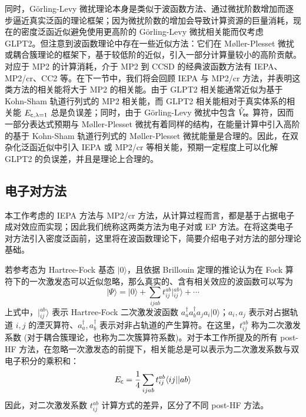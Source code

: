 同时，G\"orling-Levy 微扰理论本身是类似于波函数方法、通过微扰阶数增加而逐步逼近真实泛函的理论框架；因为微扰阶数的增加会导致计算资源的巨量消耗，现在的密度泛函近似避免使用更高阶的 G\"orling-Levy 微扰相关能而仅考虑 GLPT2。但注意到波函数理论中存在一些近似方法：它们在 M\o{}ller-Plesset 微扰或耦合簇理论的框架下，基于较低阶的近似，引入一部分计算量较小的高阶贡献。对应于 MP2 的计算消耗，介于 MP2 到 CCSD 的经典波函数方法有 IEPA\cite{Sinanoǧlu-Sinanoǧlu.ACP.1964, Nesbet-Nesbet.ACP.1965}、MP2/cr\cite{Dykstra-Davidson.IJQC.2000}、CC2\cite{Christiansen-Joergensen.CPL.1995} 等。在下一节中，我们将会回顾 IEPA 与 MP2/cr 方法，并表明这类方法的相关能将大于 MP2 的相关能。由于 GLPT2 相关能通常近似为基于 Kohn-Sham 轨道行列式的 MP2 相关能，而 GLPT2 相关能相对于真实体系的相关能 $E_{\textsf{c}, \lambda=1}$ 总是负误差；同时，由于 G\"orling-Levy 微扰中包含 $\hat V_{\textsf{ee}}$ 算符，因而一部分表达式预期与 M\o{}ller-Plesset 微扰有着同样的结构，在能量计算中引入高阶的基于 Kohn-Sham 轨道行列式的 M\o{}ller-Plesset 微扰能量是合理的。因此，在双杂化泛函近似中引入 IEPA 或 MP2/cr 等相关能，预期一定程度上可以化解 GLPT2 的负误差，并且是理论上合理的。

\subsection{电子对方法}
\label{sec.3.ep}

本工作考虑的 IEPA 方法与 MP2/cr 方法，从计算过程而言，都是基于占据电子成对效应而实现；因此我们统称这两类方法为电子对或 EP 方法。在将这类电子对方法引入密度泛函前，这里将在波函数理论下，简要介绍电子对方法的部分理论基础。

若参考态为 Hartree-Fock 基态 $| 0 \rangle$，且依据 Brillouin 定理的推论认为在 Fock 算符下的一次激发态可以近似忽略，那么真实的、含有相关效应的波函数可以写为
\begin{equation}
  | \Psi \rangle = | 0 \rangle + \sum_{ijab} t_{ij}^{ab} | {}_{ij}^{ab} \rangle + \cdots
\end{equation}
上式中，$| {}_{ij}^{ab} \rangle$ 表示 Hartree-Fock 二次激发波函数 $a_a^\dagger a_b^\dagger a_j a_i | 0 \rangle$；$a_i, a_j$ 表示对占据轨道 $i, j$ 的湮灭算符、$a_a^\dagger, a_b^\dagger$ 表示对非占轨道的产生算符。在这里，$t_{ij}^{ab}$ 称为二次激发系数 (对于耦合簇理论，也称为二次簇算符系数)。对于本工作所提及的所有 post-HF 方法，在忽略一次激发态的前提下，相关能总是可以表示为二次激发系数与双电子积分的乘积和：
\begin{equation}
  E_{\textsf{c}} = \frac{1}{4} \sum_{ijab} t_{ij}^{ab} \langle ij || ab \rangle
\end{equation}
因此，对二次激发系数 $t_{ij}^{ab}$ 计算方式的差异，区分了不同 post-HF 方法。


